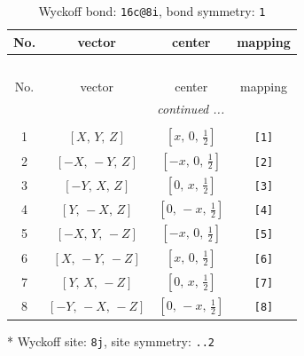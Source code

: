 \documentclass[fleqn,8pt]{jsarticle}
\begin{document}
\renewcommand{\arraystretch}{1.2}
\begin{longtable}{cccc}
\caption{Wyckoff bond: {\tt 16c@8i}, bond symmetry: {\tt 1}}
 \\
 \hline \hline
No. & vector & center & mapping \\ \hline \endfirsthead

\multicolumn{3}{l}{\tablename\ \thetable{}} \\
 \hline \hline
No. & vector & center & mapping \\ \hline \endhead

 \hline \hline
\multicolumn{3}{r}{\footnotesize\it continued ...} \\ \endfoot

 \hline \hline
\multicolumn{3}{r}{} \\ \endlastfoot

1 & $\left[ X,\, Y,\, Z \right]$ & $\left[ x,\, 0,\, \frac{1}{2} \right]$ & {\tt [1]} \\ \hline
2 & $\left[ - X,\, - Y,\, Z \right]$ & $\left[ - x,\, 0,\, \frac{1}{2} \right]$ & {\tt [2]} \\ \hline
3 & $\left[ - Y,\, X,\, Z \right]$ & $\left[ 0,\, x,\, \frac{1}{2} \right]$ & {\tt [3]} \\ \hline
4 & $\left[ Y,\, - X,\, Z \right]$ & $\left[ 0,\, - x,\, \frac{1}{2} \right]$ & {\tt [4]} \\ \hline
5 & $\left[ - X,\, Y,\, - Z \right]$ & $\left[ - x,\, 0,\, \frac{1}{2} \right]$ & {\tt [5]} \\ \hline
6 & $\left[ X,\, - Y,\, - Z \right]$ & $\left[ x,\, 0,\, \frac{1}{2} \right]$ & {\tt [6]} \\ \hline
7 & $\left[ Y,\, X,\, - Z \right]$ & $\left[ 0,\, x,\, \frac{1}{2} \right]$ & {\tt [7]} \\ \hline
8 & $\left[ - Y,\, - X,\, - Z \right]$ & $\left[ 0,\, - x,\, \frac{1}{2} \right]$ & {\tt [8]} \\
\end{longtable}
* Wyckoff site: {\tt 8j}, site symmetry: {\tt ..2}
\renewcommand{\arraystretch}{1.2}
\end{document}
